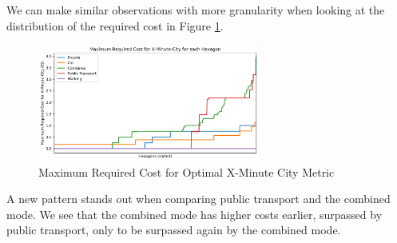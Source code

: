 We can make similar observations with more granularity when looking at the distribution of the required cost in Figure \ref{fig:maximum_required_cost_for_x_minute_city}.
\begin{figure}
  \begin{center}
    \includegraphics[width=0.65\textwidth]{Figures/results/cost/maximum_required_cost_for_x_minute_city}
  \end{center}
  \caption{Maximum Required Cost for Optimal X-Minute City Metric}
  \label{fig:maximum_required_cost_for_x_minute_city}
\end{figure}
A new pattern stands out when comparing public transport and the combined mode.
We see that the combined mode has higher costs earlier, surpassed by public transport, only to be surpassed again by the combined mode.

